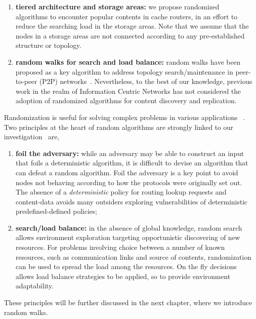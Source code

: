 \begin{enumerate}
\item \textbf{tiered architecture and storage areas: }  we propose randomized  algorithms to encounter popular 
contents in cache routers, in an effort to reduce the searching load in the storage areas. 
Note that we assume that the nodes in a storage areas are not connected according to any pre-established structure or topology. 
\item \textbf{random walks for search and load balance: } random walks have been proposed as a key algorithm
to  address 
topology search/maintenance in peer-to-peer (P2P) networks~\cite{nearoptimal}.
Nevertheless, to the best of our knowledge, previous work in the realm of Information Centric Networks  
has not considered the adoption of  randomized  algorithms for content discovery and replication. 
\end{enumerate}


Randomization is useful for solving complex problems in various applications ~\cite{mitzenmatcher}.  
Two principles at the heart of random algorithms are strongly linked to our investigation~\cite{motwani} are,
\begin{enumerate}
\item \textbf{foil the adversary:} while an adversary may be able to construct an input that foils a
deterministic algorithm, it is difficult to devise an algorithm that can defeat a
random algorithm. Foil the adversary is a key point to avoid nodes not behaving according to how the
protocols were originally set out. The absence of a \emph{deterministic}
policy for routing lookup requests and content-data avoids many outsiders exploring vulnerabilities
of deterministic predefined-defined policies;
\item \textbf{search/load balance:} in the absence of global knowledge, random search allows environment exploration
targeting opportunistic discovering of new resources. For problems involving choice between a number of known resources, 
such as communication links and source of contents, randomization can be used to spread the load among the resources. 
On the fly decisions allows load balance strategies to be applied, so to provide environment adaptability.
\end{enumerate}
These principles will be further discussed in the next chapter, where we introduce random walks. 





